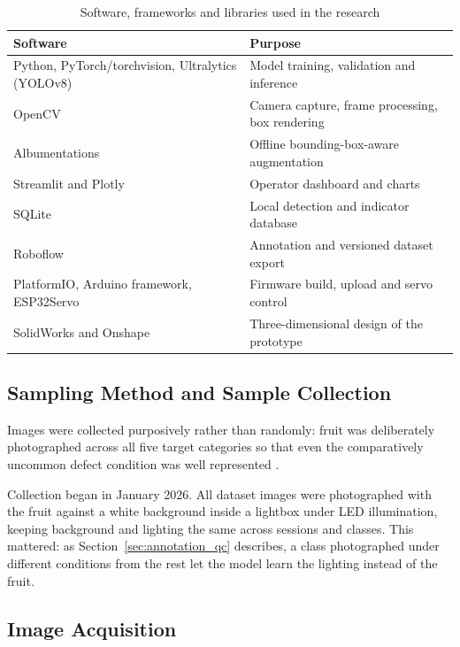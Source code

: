 \begin{table}[H]
\caption{Software, frameworks and libraries used in the research}
\label{tab:software}
\centering
\begin{tabularx}{\textwidth}{p{4.3cm} X}
\toprule
\textbf{Software} & \textbf{Purpose} \\
\midrule
Python, PyTorch/torchvision, Ultralytics (YOLOv8) & Model training, validation and inference \\
OpenCV & Camera capture, frame processing, box rendering \\
Albumentations & Offline bounding-box-aware augmentation \\
Streamlit and Plotly & Operator dashboard and charts \\
SQLite & Local detection and indicator database \\
Roboflow & Annotation and versioned dataset export \\
PlatformIO, Arduino framework, ESP32Servo & Firmware build, upload and servo control \\
SolidWorks and Onshape & Three-dimensional design of the prototype \\
\bottomrule
\end{tabularx}
\end{table}

\subsection{Sampling Method and Sample Collection}
\label{sec:m_sampling}

Images were collected purposively rather than randomly: fruit was deliberately photographed across all five target categories so that even the comparatively uncommon defect condition was well represented \citep{etikan2016}.

Collection began in January 2026. All dataset images were photographed with the fruit against a white background inside a lightbox under \acrshort{LED} illumination, keeping background and lighting the same across sessions and classes. This mattered: as Section~\ref{sec:annotation_qc} describes, a class photographed under different conditions from the rest let the model learn the lighting instead of the fruit.

\subsection{Image Acquisition}
\label{sec:m_acquisition}

